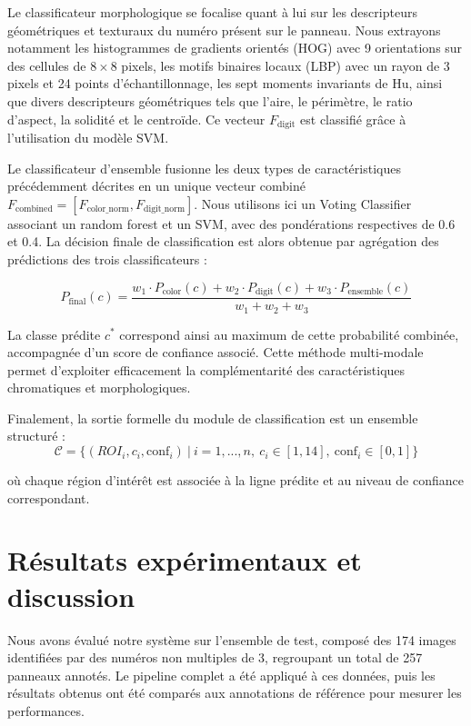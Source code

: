\documentclass[journal]{IEEEtran}
\begin{document}
Le classificateur morphologique se focalise quant à lui sur les descripteurs géométriques et texturaux du numéro présent sur le panneau. Nous extrayons notamment les histogrammes de gradients orientés (HOG) avec 9 orientations sur des cellules de $8\times8$ pixels, les motifs binaires locaux (LBP) avec un rayon de 3 pixels et 24 points d'échantillonnage, les sept moments invariants de Hu, ainsi que divers descripteurs géométriques tels que l'aire, le périmètre, le ratio d'aspect, la solidité et le centroïde. Ce vecteur $F_{\text{digit}}$ est classifié grâce à l'utilisation du modèle SVM.

Le classificateur d'ensemble fusionne les deux types de caractéristiques précédemment décrites en un unique vecteur combiné $F_{\text{combined}} = [F_{\text{color\_norm}}, F_{\text{digit\_norm}}]$. Nous utilisons ici un Voting Classifier associant un random forest et un SVM, avec des pondérations respectives de 0.6 et 0.4. La décision finale de classification est alors obtenue par agrégation des prédictions des trois classificateurs :

$$ P_{\text{final}}(c) = \frac{w_1 \cdot P_{\text{color}}(c) + w_2 \cdot P_{\text{digit}}(c) + w_3 \cdot P_{\text{ensemble}}(c)}{w_1 + w_2 + w_3}$$

La classe prédite $c^*$ correspond ainsi au maximum de cette probabilité combinée, accompagnée d'un score de confiance associé. Cette méthode multi-modale permet d'exploiter efficacement la complémentarité des caractéristiques chromatiques et morphologiques.

Finalement, la sortie formelle du module de classification est un ensemble structuré :
$$\scriptstyle \mathcal{C} = \{(ROI_i, c_i, \text{conf}_i)\ |\ i = 1,...,n,\ c_i \in [1,14],\ \text{conf}_i \in [0,1]\}$$

où chaque région d'intérêt est associée à la ligne prédite et au niveau de confiance correspondant.

\section{Résultats expérimentaux et discussion}

Nous avons évalué notre système sur l'ensemble de test, composé des 174 images identifiées par des numéros non multiples de 3, regroupant un total de 257 panneaux annotés. Le pipeline complet a été appliqué à ces données, puis les résultats obtenus ont été comparés aux annotations de référence pour mesurer les performances.
\end{document}
